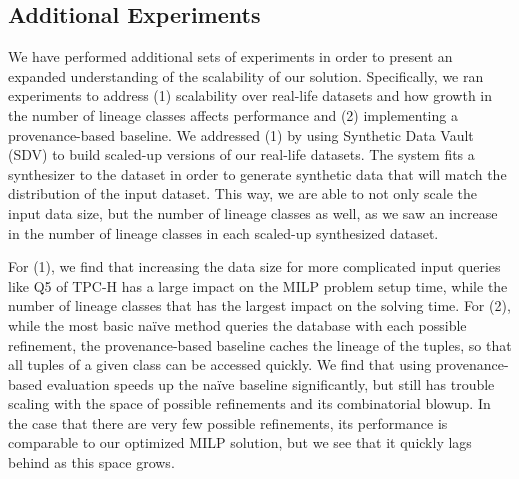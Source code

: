\documentclass[main.tex]{subfile}
\begin{document}

\subsection*{Additional Experiments}
We have performed additional sets of experiments in order to present an expanded understanding of the scalability of our solution. Specifically, we ran experiments to address (1) scalability over real-life datasets and how growth in the number of lineage classes affects performance and (2) implementing a provenance-based baseline. %
We addressed (1) by using Synthetic Data Vault (SDV) \cite{SDV} to build scaled-up versions of our real-life datasets. The system fits a synthesizer to the dataset in order to generate synthetic data that will match the distribution of the input dataset. This way, we are able to not only scale the input data size, but the number of lineage classes as well, as we saw an increase in the number of lineage classes in each scaled-up synthesized dataset. 

For (1), we find that increasing the data size for more complicated input queries like Q5 of TPC-H has a large impact on the MILP problem setup time, while the number of lineage classes that has the largest impact on the solving time. For (2), %
while the most basic na\"{i}ve method queries the database with each possible refinement, the provenance-based baseline %
caches the lineage of the tuples, so that all tuples of a given class can be accessed quickly. We find that using provenance-based evaluation speeds up the na\"{i}ve baseline significantly, but still has trouble scaling with the space of possible refinements and its combinatorial blowup. In the case that there are very few possible refinements, its performance is comparable to our optimized MILP solution, but we see that it quickly lags behind as this space grows.  
\end{document}
